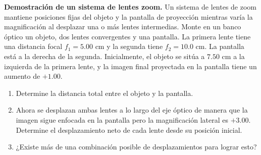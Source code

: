 \item \textbf{Demostración de un sistema de lentes zoom.}
Un sistema de lentes de zoom mantiene posiciones fijas del objeto y la pantalla de proyección mientras varía la magnificación al desplazar una o más lentes intermedias. Monte en un banco óptico un objeto, dos lentes convergentes y una pantalla. La primera lente tiene una distancia focal $f_1 = 5.00\text{ cm}$ y la segunda tiene $f_2 = 10.0\text{ cm}$. La pantalla está a la derecha de la segunda. Inicialmente, el objeto se sitúa a $7.50\text{ cm}$ a la izquierda de la primera lente, y la imagen final proyectada en la pantalla tiene un aumento de $+1.00$.
\begin{enumerate}
    \item Determine la distancia total entre el objeto y la pantalla.
    \item Ahora se desplazan ambas lentes a lo largo del eje óptico de manera que la imagen sigue enfocada en la pantalla pero la magnificación lateral es $+3.00$. Determine el desplazamiento neto de cada lente desde su posición inicial.
    \item ¿Existe más de una combinación posible de desplazamientos para lograr esto?
\end{enumerate}